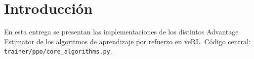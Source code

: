 \section{Introducción}
En esta entrega se presentan las implementaciones de los distintos Advantage Estimator de los algoritmos de aprendizaje por refuerzo en veRL. Código central: \texttt{trainer/ppo/core\_algorithms.py}.

